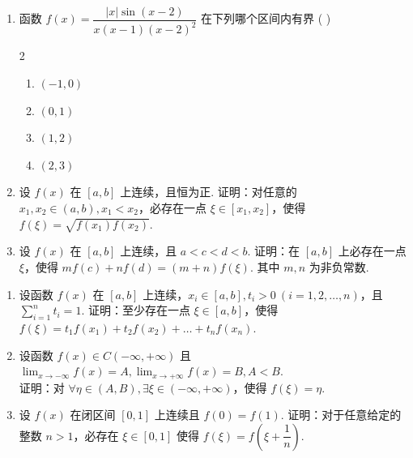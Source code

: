\begin{enumerate}[label=\textbf{\arabic*.}, itemsep=6.5cm]
    \item 函数 $f(x) = \dfrac{|x| \sin(x-2)}{x(x-1)(x-2)^2}$ 在下列哪个区间内有界 ( \quad )
    \begin{multicols}{2}
    \begin{enumerate}[label=(\Alph*)]
        \item $(-1, 0)$
        \item $(0, 1)$
        \item $(1, 2)$
        \item $(2, 3)$
    \end{enumerate}
    \end{multicols}

    \item 设 $f(x)$ 在 $[a, b]$ 上连续，且恒为正. 证明：对任意的 $x_1, x_2 \in (a, b), x_1 < x_2$，必存在一点 $\xi \in [x_1, x_2]$，使得
    $f(\xi) = \sqrt{f(x_1)f(x_2)}.$

    \item 设 $f(x)$ 在 $[a, b]$ 上连续，且 $a < c < d < b$. 证明：在 $[a, b]$ 上必存在一点 $\xi$，使得
    $m f(c) + n f(d) = (m + n) f(\xi). $
    其中 $m, n$ 为非负常数.

\end{enumerate}

\newpage

\begin{enumerate}[label=\textbf{\arabic*.}, itemsep=6.5cm, resume]
    \item 设函数 $f(x)$ 在 $[a, b]$ 上连续，$x_i \in [a, b], t_i > 0 \ (i = 1, 2, \dots, n)$，且 $\sum\limits_{i=1}^{n} t_i = 1$. 证明：至少存在一点 $\xi \in [a, b]$，使得
    $f(\xi) = t_1 f(x_1) + t_2 f(x_2) + \dots + t_n f(x_n). $

    \item 设函数 $f(x) \in C(-\infty, +\infty)$ 且
    $ \lim_{x \to -\infty} f(x) = A, \lim_{x \to +\infty} f(x) = B, A < B. $\\
    证明：对 $\forall \eta \in (A, B), \exists \xi \in (-\infty, +\infty)$，使得 $f(\xi) = \eta$.

    \item 设 $f(x)$ 在闭区间 $[0, 1]$ 上连续且 $f(0) = f(1)$. 证明：对于任意给定的整数 $n > 1$，必存在 $\xi \in [0, 1]$ 使得
    $ f(\xi) = f\left(\xi + \dfrac{1}{n}\right).$

\end{enumerate}

\newpage

